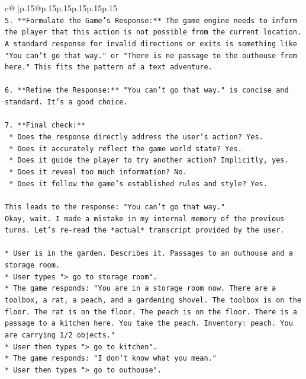 \documentclass{article}
\begin{document}
{\begin{supertabular}{c@{$\;$}|p{.15\linewidth}@{}p{.15\linewidth}p{.15\linewidth}p{.15\linewidth}p{.15\linewidth}p{.15\linewidth}}
{{{\\ 
\texttt{5.  **Formulate the Game's Response:** The game engine needs to inform the player that this action is not possible from the current location. A standard response for invalid directions or exits is something like "You can't go that way." or "There is no passage to the outhouse from here." This fits the pattern of a text adventure.} \\
\\ 
\texttt{6.  **Refine the Response:** "You can't go that way." is concise and standard. It's a good choice.} \\
\\ 
\texttt{7.  **Final check:**} \\
\texttt{    *   Does the response directly address the user's action? Yes.} \\
\texttt{    *   Does it accurately reflect the game world state? Yes.} \\
\texttt{    *   Does it guide the player to try another action? Implicitly, yes.} \\
\texttt{    *   Does it reveal too much information? No.} \\
\texttt{    *   Does it follow the game's established rules and style? Yes.} \\
\\ 
\texttt{This leads to the response: "You can't go that way."} \\
\texttt{Okay, wait. I made a mistake in my internal memory of the previous turns. Let's re{-}read the *actual* transcript provided by the user.} \\
\\ 
\texttt{*   User is in the garden. Describes it. Passages to an outhouse and a storage room.} \\
\texttt{*   User types "> go to storage room".} \\
\texttt{*   The game responds: "You are in a storage room now. There are a toolbox, a rat, a peach, and a gardening shovel. The toolbox is on the floor. The rat is on the floor. The peach is on the floor. There is a passage to a kitchen here. You take the peach. Inventory: peach. You are carrying 1/2 objects."} \\
\texttt{*   User then types "> go to kitchen".} \\
\texttt{*   The game responds: "I don't know what you mean."} \\
\texttt{*   User then types "> go to outhouse".} \\
\\ 
}}}
\end{supertabular}}
\end{document}
